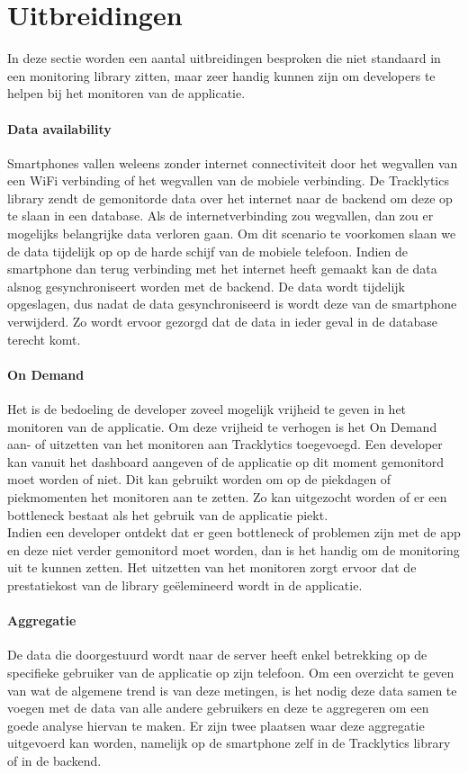 \section{Uitbreidingen}
In deze sectie worden een aantal uitbreidingen besproken die niet standaard in een monitoring library zitten, maar zeer handig kunnen zijn om developers te helpen bij het monitoren van de applicatie.

\paragraph{Data availability}
Smartphones vallen weleens zonder internet connectiviteit door het wegvallen van een WiFi verbinding of het wegvallen van de mobiele verbinding. De Tracklytics library zendt de gemonitorde data over het internet naar de backend om deze op te slaan in een database. Als de internetverbinding zou wegvallen, dan zou er mogelijks belangrijke data verloren gaan. Om dit scenario te voorkomen slaan we de data tijdelijk op op de harde schijf van de mobiele telefoon. Indien de smartphone dan terug verbinding met het internet heeft gemaakt kan de data alsnog gesynchroniseert worden met de backend. De data wordt tijdelijk opgeslagen, dus nadat de data gesynchroniseerd is wordt deze van de smartphone verwijderd. Zo wordt ervoor gezorgd dat de data in ieder geval in de database terecht komt. 

\paragraph{On Demand}\label{par:OnDemand}
Het is de bedoeling de developer zoveel mogelijk vrijheid te geven in het monitoren van de applicatie. Om deze vrijheid te verhogen is het On Demand aan- of uitzetten van het monitoren aan Tracklytics toegevoegd. Een developer kan vanuit het dashboard aangeven of de applicatie op dit moment gemonitord moet worden of niet. Dit kan gebruikt worden om op de piekdagen of piekmomenten het monitoren aan te zetten. Zo kan uitgezocht worden of er een bottleneck bestaat als het gebruik van de applicatie piekt. \\
Indien een developer ontdekt dat er geen bottleneck of problemen zijn met de app en deze niet verder gemonitord moet worden, dan is het handig om de monitoring uit te kunnen zetten. Het uitzetten van het monitoren zorgt ervoor dat de prestatiekost van de library ge\"elemineerd wordt in de applicatie.


\paragraph{Aggregatie}
De data die doorgestuurd wordt naar de server heeft enkel betrekking op de specifieke gebruiker van de applicatie op zijn telefoon. Om een overzicht te geven van wat de algemene trend is van deze metingen, is het nodig deze data samen te voegen met de data van alle andere gebruikers en deze te aggregeren om een goede analyse hiervan te maken. Er zijn twee plaatsen waar deze aggregatie uitgevoerd kan worden, namelijk op de smartphone zelf in de Tracklytics library of in de backend. \\

